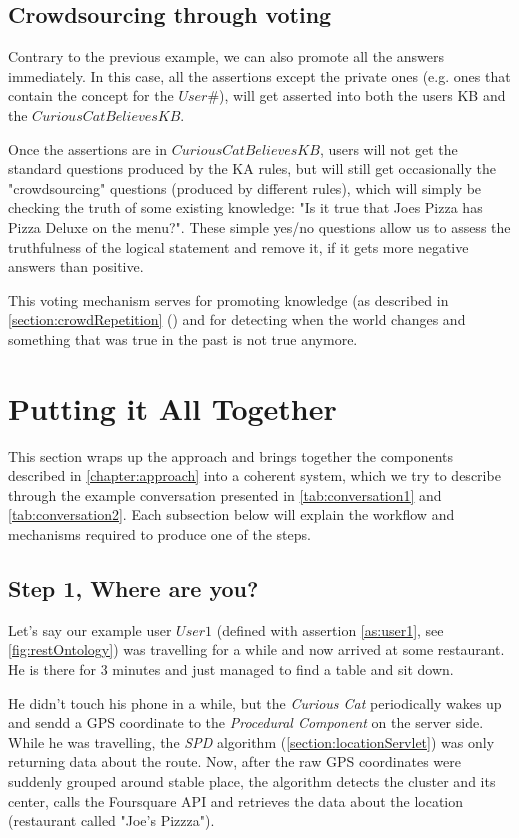 \subsection{Crowdsourcing through voting}
\label{section:crowdVoting}
Contrary to the previous example, we can also promote all the answers 
immediately. In this case, all the assertions except the private ones 
(e.g. ones that contain the concept for the $User\#$), will get asserted into 
both the users KB and the $CuriousCatBelievesKB$.

Once the assertions are in $CuriousCatBelievesKB$, users will not get the 
standard questions produced by the KA rules, but will still get occasionally 
the "crowdsourcing" questions (produced by different rules), which will 
simply be checking the truth of some existing knowledge: "Is it true that Joes 
Pizza has Pizza Deluxe on the menu?". These simple yes/no questions allow us to 
assess the truthfulness of the logical statement and remove it, if it gets 
more negative answers than positive.

This voting mechanism serves for promoting knowledge (as described in 
\autoref{section:crowdRepetition} () and for 
detecting when the world changes and something that was true in the past is not 
true anymore.

\section{Putting it All Together}
\label{section:together}
This section wraps up the approach and brings together the components described
in \autoref{chapter:approach} into a coherent system, which we try to describe 
through the example conversation presented in \autoref{tab:conversation1} and
\autoref{tab:conversation2}. Each subsection below will explain the workflow
and mechanisms required to produce one of the steps.

\subsection{Step 1, Where are you?}
\label{section:step1}
Let's say our example user $User1$ (defined with assertion \ref{as:user1}, see
\ref{fig:restOntology}) was travelling for a while
and now arrived at some restaurant. He is there for 3 minutes and just managed
to find a table and sit down.

He didn't touch his phone in a while, but the \emph{Curious Cat} periodically 
wakes up and sendd a GPS coordinate to the \emph{Procedural Component} on the
server side. While he was travelling, the \emph{SPD} algorithm 
(\autoref{section:locationServlet}) was only returning data about the route. 
Now, after the
raw GPS coordinates were suddenly grouped around stable place, the algorithm 
detects the cluster and its center, calls the Foursquare API and retrieves the 
data about the location (restaurant called "Joe's Pizzza").

